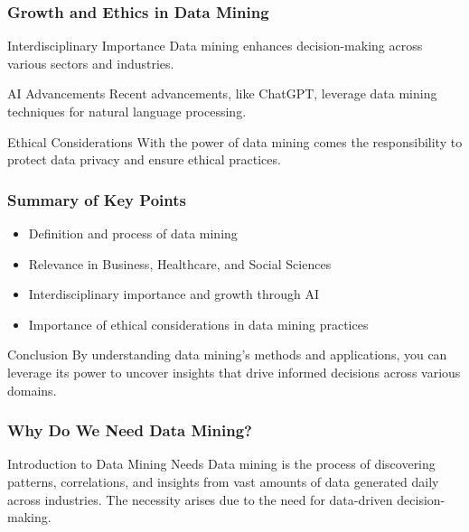 \documentclass[aspectratio=169]{beamer}
\begin{document}
\begin{frame}[fragile]
    \frametitle{Growth and Ethics in Data Mining}
    
    \begin{block}{Interdisciplinary Importance}
        Data mining enhances decision-making across various sectors and industries.
    \end{block}
    
    \begin{block}{AI Advancements}
        Recent advancements, like ChatGPT, leverage data mining techniques for natural language processing.
    \end{block}
    
    \begin{block}{Ethical Considerations}
        With the power of data mining comes the responsibility to protect data privacy and ensure ethical practices.
    \end{block}
\end{frame}

\begin{frame}[fragile]
    \frametitle{Summary of Key Points}
    
    \begin{itemize}
        \item Definition and process of data mining
        \item Relevance in Business, Healthcare, and Social Sciences
        \item Interdisciplinary importance and growth through AI
        \item Importance of ethical considerations in data mining practices
    \end{itemize}
    
    \begin{block}{Conclusion}
        By understanding data mining's methods and applications, you can leverage its power to uncover insights that drive informed decisions across various domains.
    \end{block}
\end{frame}

\begin{frame}[fragile]
    \frametitle{Why Do We Need Data Mining?}
    \begin{block}{Introduction to Data Mining Needs}
        Data mining is the process of discovering patterns, correlations, and insights from vast amounts of data generated daily across industries. The necessity arises due to the need for data-driven decision-making.
    \end{block}
\end{frame}
\end{document}
